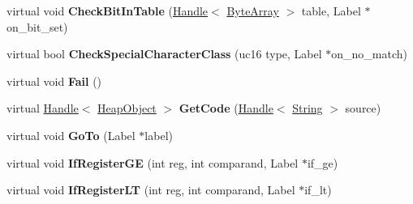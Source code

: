 \begin{DoxyCompactItemize}
\item 
\hypertarget{classv8_1_1internal_1_1_reg_exp_macro_assembler_tracer_adff9d22a692e7826d5e2270885d5b772}{}virtual void {\bfseries Check\+Bit\+In\+Table} (\hyperlink{classv8_1_1internal_1_1_handle}{Handle}$<$ \hyperlink{classv8_1_1internal_1_1_byte_array}{Byte\+Array} $>$ table, Label $\ast$on\+\_\+bit\+\_\+set)\label{classv8_1_1internal_1_1_reg_exp_macro_assembler_tracer_adff9d22a692e7826d5e2270885d5b772}

\item 
\hypertarget{classv8_1_1internal_1_1_reg_exp_macro_assembler_tracer_aeca8d834eb28764868092a5dedc3b5f1}{}virtual bool {\bfseries Check\+Special\+Character\+Class} (uc16 type, Label $\ast$on\+\_\+no\+\_\+match)\label{classv8_1_1internal_1_1_reg_exp_macro_assembler_tracer_aeca8d834eb28764868092a5dedc3b5f1}

\item 
\hypertarget{classv8_1_1internal_1_1_reg_exp_macro_assembler_tracer_adf94a12665d114768a17dcaf27fb429e}{}virtual void {\bfseries Fail} ()\label{classv8_1_1internal_1_1_reg_exp_macro_assembler_tracer_adf94a12665d114768a17dcaf27fb429e}

\item 
\hypertarget{classv8_1_1internal_1_1_reg_exp_macro_assembler_tracer_a46df7fc720c58dfc1832d9fa6b848714}{}virtual \hyperlink{classv8_1_1internal_1_1_handle}{Handle}$<$ \hyperlink{classv8_1_1internal_1_1_heap_object}{Heap\+Object} $>$ {\bfseries Get\+Code} (\hyperlink{classv8_1_1internal_1_1_handle}{Handle}$<$ \hyperlink{classv8_1_1internal_1_1_string}{String} $>$ source)\label{classv8_1_1internal_1_1_reg_exp_macro_assembler_tracer_a46df7fc720c58dfc1832d9fa6b848714}

\item 
\hypertarget{classv8_1_1internal_1_1_reg_exp_macro_assembler_tracer_a614bcded3fb3d51d3dfc2b44208e759a}{}virtual void {\bfseries Go\+To} (Label $\ast$label)\label{classv8_1_1internal_1_1_reg_exp_macro_assembler_tracer_a614bcded3fb3d51d3dfc2b44208e759a}

\item 
\hypertarget{classv8_1_1internal_1_1_reg_exp_macro_assembler_tracer_ab08520847b58c841406830f1334e3404}{}virtual void {\bfseries If\+Register\+G\+E} (int reg, int comparand, Label $\ast$if\+\_\+ge)\label{classv8_1_1internal_1_1_reg_exp_macro_assembler_tracer_ab08520847b58c841406830f1334e3404}

\item 
\hypertarget{classv8_1_1internal_1_1_reg_exp_macro_assembler_tracer_a4fdd33e492f4d0542ea2d3e56379bcb2}{}virtual void {\bfseries If\+Register\+L\+T} (int reg, int comparand, Label $\ast$if\+\_\+lt)\label{classv8_1_1internal_1_1_reg_exp_macro_assembler_tracer_a4fdd33e492f4d0542ea2d3e56379bcb2}


\end{DoxyCompactItemize}
